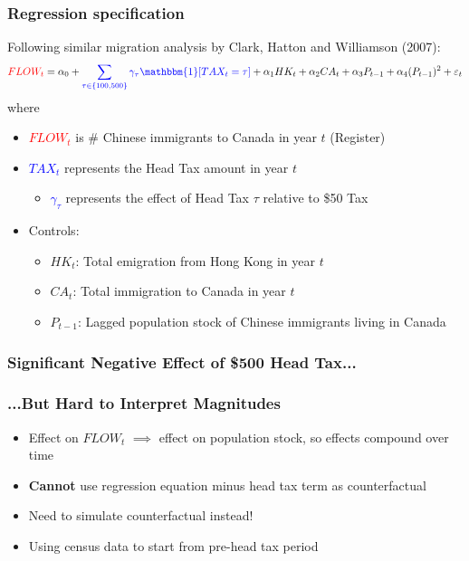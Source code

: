 \documentclass[xcolor=dvipsnames, compress, 12pt, aspectratio=169, handout]{beamer}
\begin{document}
\begin{frame}
    \frametitle{Regression specification}
    Following similar migration analysis by Clark, Hatton and Williamson (2007):
    \begin{equation*}
        \textcolor{red}{FLOW_{t}} = \alpha_0 + \textcolor{blue}{\sum_{\tau \in \{100, 500\}} \gamma_{\tau} \mathbbm{1}[TAX_t = \tau]} + \alpha_1 HK_t + \alpha_2 CA_t + \alpha_3 P_{t-1} + \alpha_4(P_{t-1})^2 + \varepsilon_t
    \end{equation*}
    where
    \begin{itemize}
        \item \textcolor{red}{$FLOW_t$} is \# Chinese immigrants to Canada in year $t$ (Register)
        \item \textcolor{blue}{$TAX_t$} represents the Head Tax amount in year $t$
        \begin{itemize}
            \item \textcolor{blue}{$\gamma_{\tau}$} represents the effect of Head Tax $\tau$ relative to \$50 Tax 
        \end{itemize}
        \item Controls: 
        \begin{itemize}
            \item $HK_t$: Total emigration from Hong Kong in year $t$
            \item $CA_t$: Total immigration to Canada in year $t$
            \item $P_{t-1}$: Lagged population stock of Chinese immigrants living in Canada
        \end{itemize}
    \end{itemize}
\end{frame}

\begin{frame}
    \label{reg_flow}
    \frametitle{Significant Negative Effect of \$500 Head Tax...}
    \centering
    \begin{table}
        \resizebox{0.7\textwidth}{!}{}
    \end{table} \hyperlink{flow_placebo1}{}
\end{frame}

\begin{frame}
    \frametitle{...But Hard to Interpret Magnitudes}
    \begin{itemize}
        \item Effect on $FLOW_t$ $\implies$ effect on population stock, so effects compound over time 
        \vspace{2mm}
        \item \textbf{Cannot} use regression equation minus head tax term as counterfactual 
        \vspace{2mm}
        \item Need to simulate counterfactual instead! 
        \vspace{2mm}
        \item Using census data to start from pre-head tax period 
    \end{itemize}
\end{frame}
\end{document}
